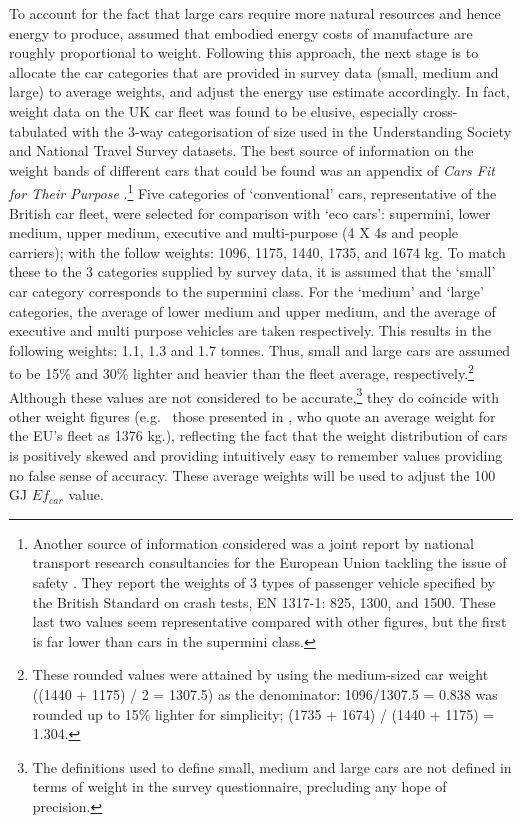 \documentclass[a4paper, 11pt, twoside]{Thesis}
\begin{document}
To account for the fact that large cars require
more natural resources and hence energy to produce, 
\citet{Mikkola201023} assumed that embodied energy costs of manufacture
are roughly proportional to weight. Following this approach, the next stage is
to allocate the car categories that are provided in survey data (small, medium
and large) to average weights, and adjust the energy use estimate accordingly.
In fact, weight data on the UK car fleet was found to be elusive, especially
cross-tabulated with the 3-way categorisation of size used in the Understanding
Society and National Travel Survey datasets. The best source of information
on the weight bands of different cars that could be found was an appendix
of \emph{Cars Fit for Their Purpose}
\citep{plowden2008cars}.\footnote{Another
source of information considered was a joint
report by national transport research consultancies for the European Union
tackling the issue of safety \citep[appendix 2]{gail2006improver}.
They report the weights of 3 types of passenger vehicle specified by
the British Standard on crash tests, EN 1317-1:
825, 1300, and 1500. These last two values seem
representative compared with other figures,
but the first is far lower than cars in the supermini class.
}
Five categories of `conventional' cars, representative of the British car fleet,
were selected for comparison with
`eco cars': supermini, lower medium, upper medium, executive and multi-purpose
(4 X 4s and people carriers); with the follow weights: 1096,
1175, 1440, 1735, and 1674 kg. To match these to the
3 categories supplied by survey data, it is assumed that the `small' car
category corresponds to the supermini class. For the `medium' and `large'
categories, the average of lower medium and upper medium,
and the average of executive and multi purpose vehicles are taken respectively.
This results in the following weights: 1.1, 1.3 and 1.7 tonnes.
Thus, small and large cars are assumed
to be 15\% and 30\% lighter and heavier than the fleet average,
respectively.\footnote{These rounded values
were attained by using the medium-sized car weight
((1440 + 1175) / 2 = 1307.5)
as the denominator: 1096/1307.5 = 0.838 was rounded up
to 15\% lighter for simplicity; (1735 + 1674) / (1440 + 1175)
= 1.304.
}
Although these values are not considered to be
accurate,\footnote{The
definitions used to define small, medium and large cars
are not defined in terms of weight in the survey questionnaire,
precluding any hope of precision.
}
they do coincide with other weight figures
(e.g.~ those presented in \citep[appendix 2]{gail2006improver}, who quote an
average weight for the EU's fleet as 1376 kg.), reflecting the fact that
the weight distribution of cars is positively skewed and providing
intuitively easy to remember values providing no false sense of accuracy.
These average weights will be used to
adjust the 100 GJ $Ef_{car}$ value.
\end{document}
